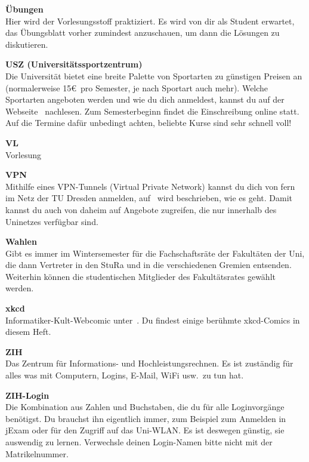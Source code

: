 \begin{multicols}{2}
\textbf{Übungen} \\
Hier wird der Vorlesungsstoff praktiziert.
Es wird von dir als Student erwartet, das Übungsblatt vorher zumindest anzuschauen, um dann die Lösungen zu diskutieren.

\textbf{USZ (Universitätssportzentrum)} \\
Die Universität bietet eine breite Palette von Sportarten zu günstigen Preisen an (normalerweise 15\euro\ pro Semester, je nach Sportart auch mehr).
Welche Sportarten angeboten werden und wie du dich anmeldest, kannst du auf der Webseite~ nachlesen.
Zum Semesterbeginn findet die Einschreibung online statt.
Auf die Termine dafür unbedingt achten, beliebte Kurse sind sehr schnell voll!

\vfill\columnbreak%

\textbf{VL} \\
Vorlesung

\textbf{VPN}\\
Mithilfe eines VPN-Tunnels (Virtual Private Network) kannst du dich von fern im Netz der TU Dresden anmelden, auf~ wird beschrieben, wie es geht.
Damit kannst du auch von daheim auf Angebote zugreifen, die nur innerhalb des Uninetzes verfügbar sind.

\textbf{Wahlen} \\
Gibt es immer im Wintersemester für die Fachschaftsräte der Fakultäten der Uni, die dann Vertreter in den StuRa und in die verschiedenen Gremien entsenden.
Weiterhin können die studentischen Mitglieder des Fakultätsrates gewählt werden.

\textbf{xkcd} \\
Informatiker-Kult-Webcomic unter~. Du findest einige berühmte xkcd-Comics in diesem Heft.

\textbf{ZIH} \\
Das Zentrum für Informations- und Hochleistungsrechnen.
Es ist zuständig für alles was mit Computern, Logins, E-Mail, WiFi usw.\ zu tun hat.

\textbf{ZIH-Login} \\
Die Kombination aus Zahlen und Buchstaben, die du für alle Loginvorgänge
benötigst. Du brauchst ihn eigentlich immer, zum Beispiel zum Anmelden in jExam
oder für den Zugriff auf das Uni-WLAN\@. Es ist deswegen günstig, sie auswendig
zu lernen. Verwechsle deinen Login-Namen bitte nicht mit der Matrikelnummer.

\end{multicols}

